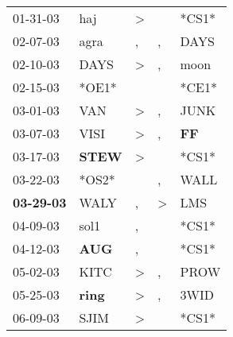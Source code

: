 \begin{supertabular}{p{0.07\textwidth}p{0.06\textwidth}p{0.02\textwidth}p{0.02\textwidth}p{0.06\textwidth}}
          01-31-03\textsuperscript{} &            haj\textsuperscript{} &     \textgreater &                  &                            *CS1* \\
          02-07-03\textsuperscript{} &           agra\textsuperscript{} &                , &                , &           DAYS\textsuperscript{} \\
          02-10-03\textsuperscript{} &           DAYS\textsuperscript{} &     \textgreater &                , &           moon\textsuperscript{} \\
          02-15-03\textsuperscript{} &                            *OE1* &                  &                  &                            *CE1* \\
          03-01-03\textsuperscript{} &            VAN\textsuperscript{} &     \textgreater &                , &           JUNK\textsuperscript{} \\
          03-07-03\textsuperscript{} &           VISI\textsuperscript{} &     \textgreater &                , &    \textbf{FF\textsuperscript{}} \\
          03-17-03\textsuperscript{} &  \textbf{STEW\textsuperscript{}} &     \textgreater &                  &                            *CS1* \\
          03-22-03\textsuperscript{} &                            *OS2* &                  &                , &           WALL\textsuperscript{} \\
 \textbf{03-29-03\textsuperscript{}} &           WALY\textsuperscript{} &                , &     \textgreater &            LMS\textsuperscript{} \\
          04-09-03\textsuperscript{} &           sol1\textsuperscript{} &                , &                  &                            *CS1* \\
          04-12-03\textsuperscript{} &   \textbf{AUG\textsuperscript{}} &                , &                  &                            *CS1* \\
          05-02-03\textsuperscript{} &           KITC\textsuperscript{} &     \textgreater &                , &           PROW\textsuperscript{} \\
          05-25-03\textsuperscript{} &  \textbf{ring\textsuperscript{}} &     \textgreater &                , &           3WID\textsuperscript{} \\
          06-09-03\textsuperscript{} &           SJIM\textsuperscript{} &     \textgreater &                  &                            *CS1* \\

\end{supertabular}
